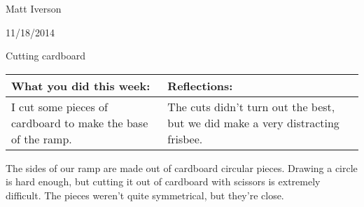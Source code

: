 Matt Iverson

11/18/2014

Cutting cardboard

\begin{tabular}{|p{5cm}|p{5cm}|}
 \hline
 What you did this week:
 &
 Reflections:
 \\
 \hline
 I cut some pieces of cardboard to make the base of the ramp.
 &
 The cuts didn't turn out the best, but we did make a very distracting frisbee.
 \\
 \hline
\end{tabular}


The sides of our ramp are made out of cardboard circular pieces. Drawing a circle is hard enough, but cutting it out of cardboard with scissors is extremely difficult. The pieces weren't quite symmetrical, but they're close.
